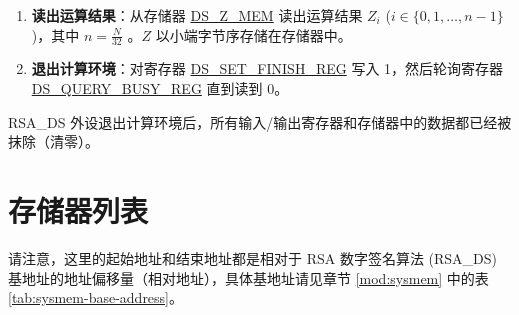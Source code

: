 \documentclass[main\_\_CN.tex]{subfiles}
\begin{document}
\begin{enumerate}
\begin{itemize}
        \item 如果返回值为 3，则说明填充校验失败，且 MD 校验失败。 这种情况说明有致命错误发生。\begin{math}Z\end{math} 结果值无效。跳至步骤 \ref{other:digsig-step-exit}。

    \end{itemize}

    \item {\bfseries 读出运算结果}：从存储器 \hyperref[DSZMEM]{DS\_Z\_MEM} 读出运算结果 \begin{math}Z_{i}\end{math} (\begin{math}i \in \{0,1, \dots,n-1\}\end{math})，其中 \begin{math} n = \frac{N}{32} \end{math} 。\begin{math}Z\end{math} 以小端字节序存储在存储器中。

    \item {\bfseries 退出计算环境\label{other:digsig-step-exit}}：对寄存器 \hyperref[regdesc:DSSETFINISHREG]{DS\_SET\_FINISH\_REG} 写入 1，然后轮询寄存器 \hyperref[regdesc:DSQUERYBUSYREG]{DS\_QUERY\_BUSY\_REG} 直到读到 0。

\end{enumerate}

RSA\_DS 外设退出计算环境后，所有输入/输出寄存器和存储器中的数据都已经被抹除（清零）。



\clearpage
\section{ 存储器列表 }
\label{sec:digsig-mem-summ}

请注意，这里的起始地址和结束地址都是相对于 RSA 数字签名算法 (RSA\_DS) 基地址的地址偏移量（相对地址），具体基地址请见章节 \ref{mod:sysmem} \textit{} 中的表 \ref{tab:sysmem-base-address}。





\end{document}
